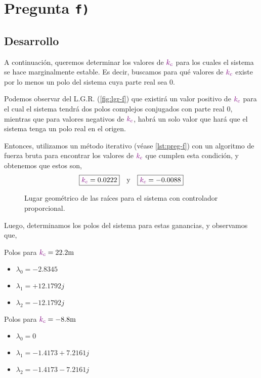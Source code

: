 \section{Pregunta \texttt{f)}}\label{pregunta-f}

\subsection{Desarrollo}

A continuación, queremos determinar los valores de $\mathbin{\color{violet}k_{c}}$ para los cuales
el sistema se hace marginalmente estable. Es decir, buscamos para qué valores de
$\mathbin{\color{violet}k_{c}}$ existe por lo menos un polo del sistema cuya parte real sea $0$.

Podemos observar del L.G.R. (\autoref{fig:lgr-f}) que existirá un valor positivo
de $\mathbin{\color{violet}k_{c}}$ para el cual el sistema tendrá dos polos complejos conjugados
con parte real $0$, mientras que para valores negativos de $\mathbin{\color{violet}k_{c}}$, habrá
un solo valor que hará que el sistema tenga un polo real en el origen.

Entonces, utilizamos un método iterativo (véase \autoref{lst:preg-f}) con un
algoritmo de fuerza bruta para encontrar los valores de $\mathbin{\color{violet}k_{c}}$ que
cumplen esta condición, y obtenemos que estos son,
\begin{equation}
    \boxed{\mathbin{\color{violet}k_{c}} = 0.0222} \quad \text{y} \quad \boxed{\mathbin{\color{violet}k_{c}} = -0.0088}
\end{equation}

\begin{figure}[ht]
  \centering
  
  \caption{Lugar geométrico de las raíces para el sistema con controlador proporcional.}
  \label{fig:lgr-f}
\end{figure}

Luego, determinamos los polos del sistema para estas ganancias, y observamos que,
\begin{multicols}{2}
    Polos para $\mora{k_{c}} = 22.2\unit{m}$
    \begin{itemize}
        \item $\lambda_{0} = -2.8345$
        \item $\lambda_{1} = +12.1792j$
        \item $\lambda_{2} = -12.1792j$
    \end{itemize}

    Polos para $\mora{k_{c}} = -8.8\unit{m}$
    \begin{itemize}
        \item $\lambda_{0} = 0$
        \item $\lambda_{1} = -1.4173 + 7.2161j$
        \item $\lambda_{2} = -1.4173 - 7.2161j$
    \end{itemize}
\end{multicols}

